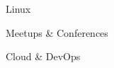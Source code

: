 \begin{SideBar}{\ColorBackground}{\ColorTextSide}
  \begin{ItemList}{\ColorHighlight}
    \item [\ding{72}] Linux
    \item [\ding{72}] Meetups \& Conferences
    \item [\ding{72}] Cloud \& DevOps
  \end{ItemList}
  \vspace{0.5cm}
\end{SideBar}